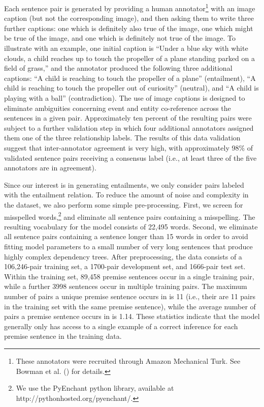 \documentclass[utf8]{frontiersSCNS} %
\begin{document}
Each sentence pair is generated by providing a human annotator\footnote{These annotators were recruited through Amazon Mechanical Turk. See Bowman et al. (\citeyear{Bowman:2015}) for details.} with an image caption (but not the corresponding image), and then asking them to write three further captions: one which is definitely also true of the image, one which might be true of the image, and one which is definitely not true of the image. To illustrate with an example, one initial caption is ``Under a blue sky with white clouds, a child reaches up to touch the propeller of a plane standing parked on a field of grass,'' and the annotator produced the following three additional captions: ``A child is reaching to touch the propeller of a plane'' (entailment), ``A child is reaching to touch the propeller out of curiosity'' (neutral), and ``A child is playing with a ball'' (contradiction). The use of image captions is designed to eliminate ambiguities concerning event and entity co-reference across the sentences in a given pair. Approximately ten percent of the resulting pairs were subject to a further validation step in which four additional annotators assigned them one of the three relationship labels. The results of this data validation suggest that inter-annotator agreement is very high, with approximately 98\% of validated sentence pairs receiving a consensus label (i.e., at least three of the five annotators are in agreement).

Since our interest is in generating entailments, we only consider pairs labeled with the entailment relation. To reduce the amount of noise and complexity in the dataset, we also perform some simple pre-processing. First, we screen for misspelled words,\footnote{We use the PyEnchant python library, available at http://pythonhosted.org/pyenchant/.} and eliminate all sentence pairs containing a misspelling. The resulting vocabulary for the model consists of 22,495 words. Second, we eliminate all sentence pairs containing a sentence longer than 15 words in order to avoid fitting model parameters to a small number of very long sentences that produce highly complex dependency trees. After preprocessing, the data consists of a 106,246-pair training set, a 1700-pair development set, and 1666-pair test set. Within the training set, 89,458 premise sentences occur in a single training pair, while a further 3998 sentences occur in multiple training pairs. The maximum number of pairs a unique premise sentence occurs in is 11 (i.e., their are 11 pairs in the training set with the same premise sentence), while the average number of pairs a premise sentence occurs in is 1.14. These statistics indicate that the model generally only has access to a single example of a correct inference for each premise sentence in the training data. 
\end{document}
